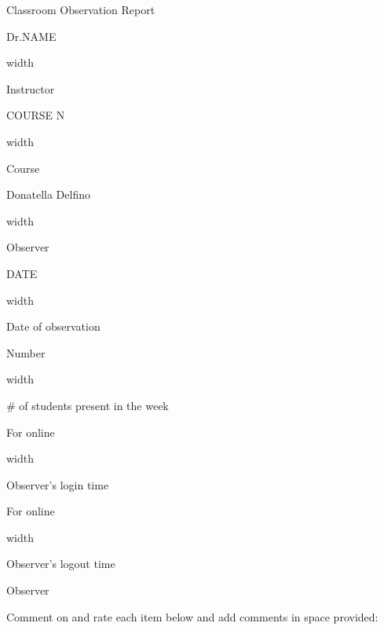 \documentclass[11pt,dvipsnames]{article}
\newcommand*{\linesep}[1]{%
	\par\nobreak
	\vskip 3pt \leaders\vrule width #1\vskip 0.81pt
	\nobreak
}
\begin{document}
	\begin{center}
		{\Large Classroom Observation Report}
	\end{center}
\begin{minipage}{0.35\textwidth}
		Dr.NAME \par
		\linesep{\textwidth}
		Instructor
	\end{minipage}
\hspace{0.2\textwidth}
	\begin{minipage}{0.35\textwidth}
			COURSE N \par
			\linesep{\textwidth}
			Course
		\end{minipage}
		
\vskip 1cm
		
\begin{minipage}{0.35\textwidth}
	Donatella Delfino \par
	\linesep{\textwidth}
	Observer
\end{minipage}
\hspace{0.2\textwidth}
\begin{minipage}{0.35\textwidth}
	DATE \par
	\linesep{\textwidth}
	Date of observation
\end{minipage}

\vskip 1cm

\begin{minipage}{0.35\textwidth}
	Number \par
	\linesep{\textwidth}
	\# of students present in the week
\end{minipage}

\vskip 1cm

\begin{minipage}{0.35\textwidth}
	For online \par
	\linesep{\textwidth}
	Observer's login time
\end{minipage}
\hspace{0.2\textwidth}
\begin{minipage}{0.35\textwidth}
	For online \par
	\linesep{\textwidth}
	Observer's logout time
\end{minipage}

\vskip 1cm
{\large Observer}

Comment on and rate each item below and add comments in space provided:
\vskip 0.5cm

		
\end{document}

